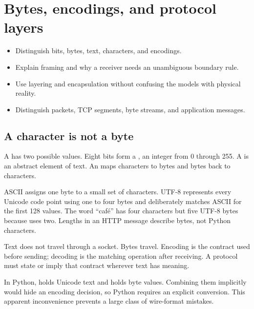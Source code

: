 \chapter{Bytes, encodings, and protocol layers}

\begin{objectives}
\begin{itemize}
  \item Distinguish bits, bytes, text, characters, and encodings.
  \item Explain framing and why a receiver needs an unambiguous boundary rule.
  \item Use layering and encapsulation without confusing the models with physical reality.
  \item Distinguish packets, TCP segments, byte streams, and application messages.
\end{itemize}
\end{objectives}

\section{A character is not a byte}

A  has two possible values. Eight bits form a , an integer
from 0 through 255. A  is an abstract element of text. An
 maps characters to bytes and bytes back to characters.

ASCII assigns one byte to a small set of characters. UTF-8 represents every
Unicode code point using one to four bytes and deliberately matches ASCII for
the first 128 values. The word ``café'' has four characters but five UTF-8
bytes because  uses two. Lengths in an HTTP message describe bytes, not
Python characters.

\begin{mentalmodel}
Text does not travel through a socket. Bytes travel. Encoding is the contract
used before sending; decoding is the matching operation after receiving. A
protocol must state or imply that contract wherever text has meaning.
\end{mentalmodel}

In Python,  holds Unicode text and  holds byte values.
Combining them implicitly would hide an encoding decision, so Python requires an
explicit conversion. This apparent inconvenience prevents a large class of
wire-format mistakes.

